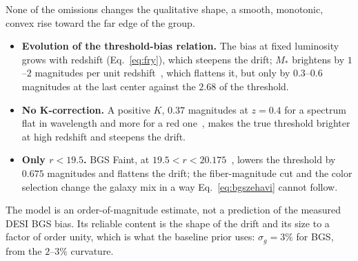 None of the omissions changes the qualitative shape, a smooth,
monotonic, convex rise toward the far edge of the group.
\begin{itemize}
  \item \textbf{Evolution of the threshold-bias relation.}  The bias at
    fixed luminosity grows with redshift (Eq.~\eqref{eq:fry}), which
    steepens the drift; $M_*$ brightens by $1$--$2$ magnitudes per unit
    redshift~\cite{Blanton2003}, which flattens it, but only by
    $0.3$--$0.6$ magnitudes at the last center against the $2.68$ of
    the threshold.
  \item \textbf{No K-correction.}  A positive $K$, $0.37$ magnitudes at
    $z = 0.4$ for a spectrum flat in wavelength and more for a red
    one~\cite{BlantonRoweis2007}, makes the true threshold brighter at
    high redshift and steepens the drift.
  \item \textbf{Only $r < 19.5$.}  BGS Faint, at
    $19.5 < r < 20.175$~\cite{Hahn2023}, lowers the threshold by $0.675$
    magnitudes and flattens the drift; the fiber-magnitude cut and the
    color selection change the galaxy mix in a way
    Eq.~\eqref{eq:bgszehavi} cannot follow.
\end{itemize}
The model is an order-of-magnitude estimate, not a prediction of the
measured DESI BGS bias.  Its reliable content is the shape of the drift
and its size to a factor of order unity, which is what the baseline
prior uses: $\sigma_g = 3\%$ for BGS, from the $2$--$3\%$ curvature.

